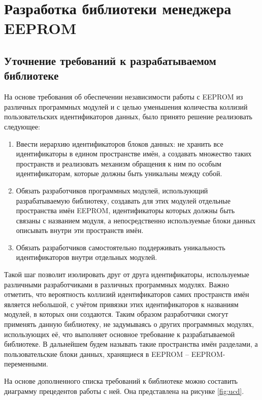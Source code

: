 \chapter{Разработка библиотеки менеджера EEPROM}

\section{Уточнение требований к разрабатываемом библиотеке}

На основе требования об обеспечении независимости работы с EEPROM из различных программных модулей и с целью уменьшения количества коллизий пользовательских идентификаторов данных, было принято решение реализовать следующее:
\begin{enumerate}
	\item Ввести иерархию идентификаторов блоков данных: не хранить все идентификаторы в едином пространстве имён, а создавать множество таких пространств и реализовать механизм обращения к ним по особым идентификаторам, которые должны быть уникальны между собой.
	\item Обязать разработчиков программных модулей, использующий разрабатываемую библиотеку, создавать для этих модулей отдельные пространства имён EEPROM, идентификаторы которых должны быть связаны с названием модуля, а непосредственно используемые блоки данных описывать внутри эти пространств имён.
	\item Обязать разработчиков самостоятельно поддерживать уникальность идентификаторов внутри отдельных модулей.
\end{enumerate}

Такой шаг позволит изолировать друг от друга идентификаторы, используемые различными разработчиками в различных программных модулях.
Важно отметить, что вероятность коллизий идентификаторов самих пространств имён является небольшой, с учётом привязки этих идентификаторов к названиям модулей, в которых они создаются.
Таким образом разработчики смогут применять данную библиотеку, не задумываясь о других программных модулях, использующих её, что выполняет основное требование к разрабатываемой библиотеке.
В дальнейшем будем называть такие пространства имён разделами, а пользовательские блоки данных, хранящиеся в EEPROM -- EEPROM-переменными.

На основе дополненного списка требований к библиотеке можно составить диаграмму прецедентов работы с ней. Она представлена на рисунке \ref{fig:ucd}.


